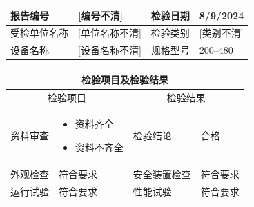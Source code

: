 \documentclass[UTF8,10pt,a4paper,fontset=fandol]{ctexart}
\newcommand{\fieldvalue}[1]{#1}
\newcommand{\handwritten}[1]{#1}
\begin{document}
\begin{tabularx}{\textwidth}{|p{3.2cm}|X|p{3.2cm}|X|}
\hline
报告编号 &
\fieldvalue{\handwritten{[编号不清]}} &
检验日期 &
\fieldvalue{\handwritten{8/9/2024}} \\
\hline
受检单位名称 &
\fieldvalue{\handwritten{[单位名称不清]}} &
检验类别 &
\fieldvalue{\handwritten{[类别不清]}} \\
\hline
设备名称 &
\fieldvalue{\handwritten{[设备名称不清]}} &
规格型号 &
\fieldvalue{\handwritten{200--480}} \\
\hline
\end{tabularx}

\vspace{0.5em}

\begin{tabularx}{\textwidth}{|p{4.2cm}|X|p{4.2cm}|X|}
\hline
\multicolumn{4}{|c|}{\textbf{检验项目及检验结果}}\\
\hline
\multicolumn{2}{|c|}{检验项目} &
\multicolumn{2}{c|}{检验结果}\\
\hline
资料审查 &
\begin{itemize}
\item 资料齐全
\item 资料不齐全
\end{itemize}
&
检验结论 &
\fieldvalue{合格} \\
\hline
外观检查 &
\fieldvalue{符合要求} &
安全装置检查 &
\fieldvalue{符合要求} \\
\hline
运行试验 &
\fieldvalue{符合要求} &
性能试验 &
\fieldvalue{符合要求} \\
\hline
\end{tabularx}
\end{document}
